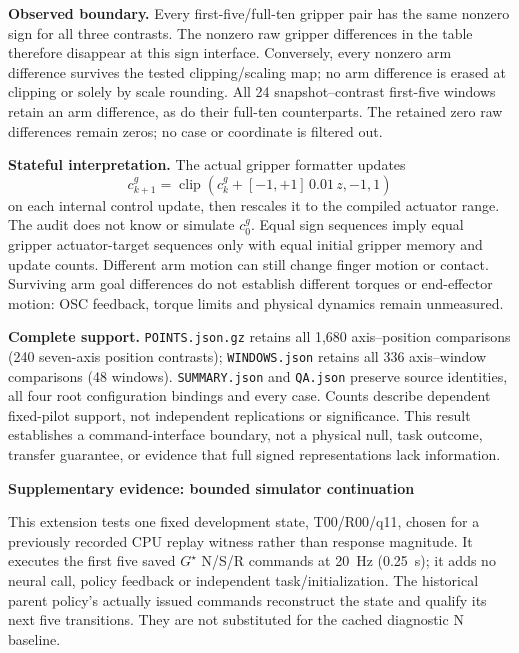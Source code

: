 \documentclass[conference]{IEEEtran}
\begin{document}


\noindent\textbf{Observed boundary.} Every first-five/full-ten gripper pair has the same nonzero sign for all three contrasts. The nonzero raw gripper differences in the table therefore disappear at this sign interface. Conversely, every nonzero arm difference survives the tested clipping/scaling map; no arm difference is erased at clipping or solely by scale rounding. All 24 snapshot--contrast first-five windows retain an arm difference, as do their full-ten counterparts. The retained zero raw differences remain zeros; no case or coordinate is filtered out.

\noindent\textbf{Stateful interpretation.} The actual gripper formatter updates
\[
 c^{g}_{k+1}=\operatorname{clip}\!\left(c^{g}_k+[-1,+1]\,0.01\,z,-1,1\right)
\]
on each internal control update, then rescales it to the compiled actuator range. The audit does not know or simulate $c^{g}_0$. Equal sign sequences imply equal gripper actuator-target sequences only with equal initial gripper memory and update counts. Different arm motion can still change finger motion or contact. Surviving arm goal differences do not establish different torques or end-effector motion: OSC feedback, torque limits and physical dynamics remain unmeasured.

\noindent\textbf{Complete support.} \texttt{POINTS.json.gz} retains all 1,680 axis--position comparisons (240 seven-axis position contrasts); \texttt{WINDOWS.json} retains all 336 axis--window comparisons (48 windows). \texttt{SUMMARY.json} and \texttt{QA.json} preserve source identities, all four root configuration bindings and every case. Counts describe dependent fixed-pilot support, not independent replications or significance. This result establishes a command-interface boundary, not a physical null, task outcome, transfer guarantee, or evidence that full signed representations lack information.
\clearpage
\begin{center}{\Large\bfseries Supplementary evidence: bounded simulator continuation}\end{center}
\noindent This extension tests one fixed development state, T00/R00/q11, chosen for a previously recorded CPU replay witness rather than response magnitude. It executes the first five saved $G^\star$ N/S/R commands at 20~Hz (0.25~s); it adds no neural call, policy feedback or independent task/initialization. The historical parent policy's actually issued commands reconstruct the state and qualify its next five transitions. They are not substituted for the cached diagnostic N baseline.
\end{document}
